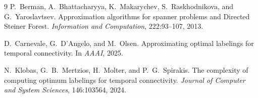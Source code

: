 \documentclass[11pt]{article}
\theoremstyle{definition}
\theoremstyle{remark}
\begin{document}
\begin{thebibliography}{9}
P.~Berman, A.~Bhattacharyya, K.~Makarychev, S.~Raskhodnikova, and G.~Yaroslavtsev.
\newblock Approximation algorithms for spanner problems and Directed Steiner Forest.
\newblock \emph{Information and Computation}, 222:93--107, 2013.

D.~Carnevale, G.~D'Angelo, and M.~Olsen.
\newblock Approximating optimal labelings for temporal connectivity.
\newblock In \emph{AAAI}, 2025.

N.~Klobas, G.~B.~Mertzios, H.~Molter, and P.~G.~Spirakis.
\newblock The complexity of computing optimum labelings for temporal connectivity.
\newblock \emph{Journal of Computer and System Sciences}, 146:103564, 2024.
\end{thebibliography}
\end{document}
